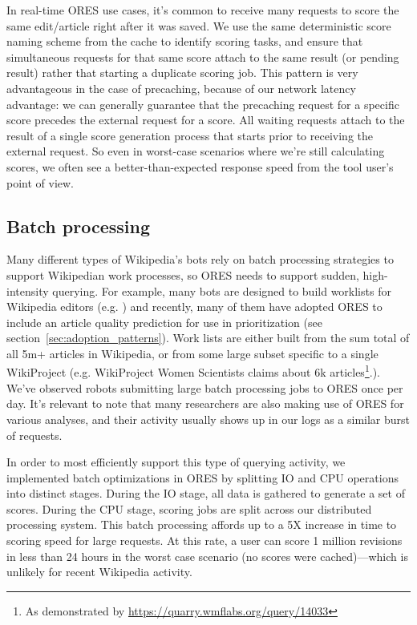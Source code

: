 In real-time ORES use cases, it's common to receive many requests to score the same edit/article right after it was saved.  We use the same deterministic score naming scheme from the cache to identify scoring tasks, and ensure that simultaneous requests for that same score attach to the same result (or pending result) rather that starting a duplicate scoring job.  This pattern is very advantageous in the case of precaching, because of our network latency advantage: we can generally guarantee that the precaching request for a specific score precedes the external request for a score.  All waiting requests attach to the result of a single score generation process that starts prior to receiving the external request.  So even in worst-case scenarios where we're still calculating scores, we often see a better-than-expected response speed from the tool user's point of view.

\subsection{Batch processing}
Many different types of Wikipedia's bots rely on batch processing strategies to support Wikipedian work processes\cite{geiger2011lives}, so ORES needs to support sudden, high-intensity querying.  For example, many bots are designed to build worklists for Wikipedia editors (e.g. \cite{cosley2007suggestbot}) and recently, many of them have adopted ORES to include an article quality prediction for use in prioritization (see section~\ref{sec:adoption_patterns}).  Work lists are either built from the sum total of all 5m+ articles in Wikipedia, or from some large subset specific to a single WikiProject (e.g. WikiProject Women Scientists claims about 6k articles\footnote{As demonstrated by \url{https://quarry.wmflabs.org/query/14033}}.).  We've observed robots submitting large batch processing jobs to ORES once per day.  It's relevant to note that many researchers are also making use of ORES for various analyses, and their activity usually shows up in our logs as a similar burst of requests.

In order to most efficiently support this type of querying activity, we implemented batch optimizations in ORES by splitting IO and CPU operations into distinct stages.  During the IO stage, all data is gathered to generate a set of scores.  During the CPU stage, scoring jobs are split across our distributed processing system.  This batch processing affords up to a 5X increase in time to scoring speed for large requests\cite{sarabadani2017building}.  At this rate, a user can score 1 million revisions in less than 24 hours in the worst case scenario (no scores were cached)---which is unlikely for recent Wikipedia activity.

